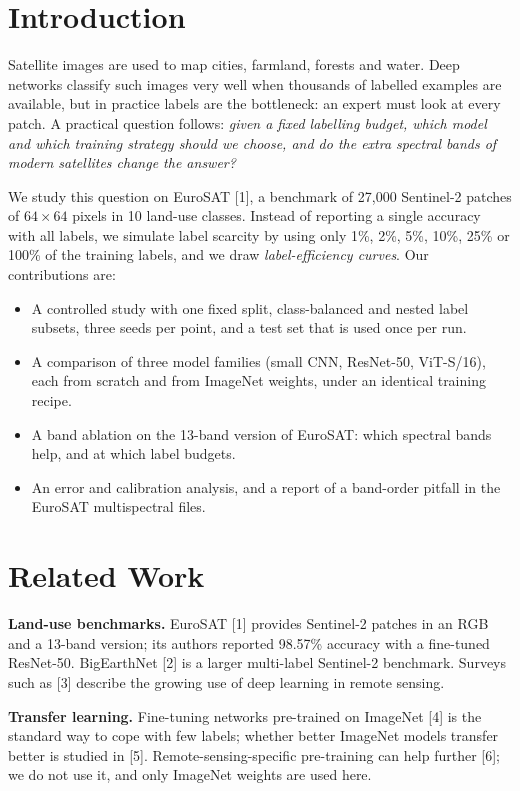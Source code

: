 \documentclass[twoside,a4paper,11pt]{article}
\begin{document}
\section{Introduction}

Satellite images are used to map cities, farmland, forests and water. Deep
networks classify such images very well when thousands of labelled examples
are available, but in practice labels are the bottleneck: an expert must look at every
patch. A practical question follows: \emph{given a fixed labelling budget, which
model and which training strategy should we choose, and do the extra spectral
bands of modern satellites change the answer?}

We study this question on EuroSAT [1], a benchmark of 27,000 Sentinel-2 patches of
$64\times64$ pixels in 10 land-use classes. Instead of reporting a single
accuracy with all labels, we simulate label scarcity by using only 1\%, 2\%, 5\%,
10\%, 25\% or 100\% of the training labels, and we draw
\emph{label-efficiency curves}. Our contributions are:

\begin{itemize}
\item A controlled study with one fixed split, class-balanced and nested label subsets,
three seeds per point, and a test set that is used once per run.
\item A comparison of three model families (small CNN, ResNet-50, ViT-S/16), each from
scratch and from ImageNet weights, under an identical training recipe.
\item A band ablation on the 13-band version of EuroSAT: which spectral bands help,
and at which label budgets.
\item An error and calibration analysis, and a report of a band-order pitfall in the
EuroSAT multispectral files.
\end{itemize}

\section{Related Work}

\textbf{Land-use benchmarks.} EuroSAT [1] provides Sentinel-2 patches in an RGB
and a 13-band version; its authors reported 98.57\% accuracy with a fine-tuned
ResNet-50. BigEarthNet [2] is a larger multi-label Sentinel-2 benchmark. Surveys
such as [3] describe the growing use of deep learning in remote sensing.

\textbf{Transfer learning.} Fine-tuning networks pre-trained on ImageNet [4] is the
standard way to cope with few labels; whether better ImageNet models transfer better
is studied in [5]. Remote-sensing-specific pre-training can help further [6]; we do not
use it, and only ImageNet weights are used here.
\end{document}
